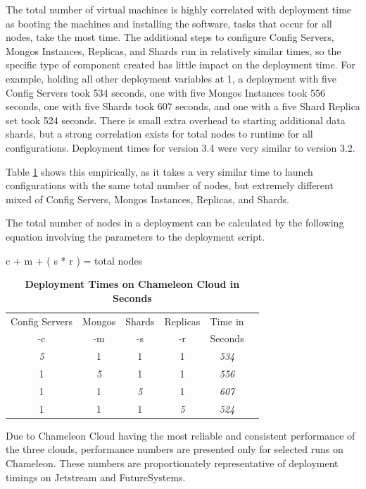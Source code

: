 \documentclass[9pt,twocolumn,twoside]{../../styles/osajnl}
\begin{document}
The total number of virtual machines is highly correlated with deployment time as booting the machines and installing the software, tasks that occur for all nodes, take the most time.  The additional steps to configure Config Servers, Mongos Instances, Replicas, and Shards run in relatively similar times, so the specific type of component created has little impact on the deployment time.  For example, holding all other deployment variables at 1, a deployment with five Config Servers took 534 seconds, one with five Mongos Instances took 556 seconds, one with five Shards took 607 seconds, and one with a five Shard Replica set took 524 seconds.  There is small extra overhead to starting additional data shards, but a strong correlation exists for total nodes to runtime for all configurations.  Deployment times for version 3.4 were very similar to version 3.2.

Table \ref{tab:deploy-times2} shows this empirically, as it takes a very similar time to launch configurations with the same total number of nodes, but extremely different mixed of Config Servers, Mongos Instances, Replicas, and Shards.

The total number of nodes in a deployment can be calculated by the following equation involving the parameters to the deployment script.

c + m + ( s * r ) = total nodes

\begin{table}[htbp]
\centering
\caption{\bf Deployment Times on Chameleon Cloud in Seconds}

 \begin{tabular}{| c | c | c | c | c | c |} 
 \hline
Config Servers &  Mongos & Shards & Replicas & Time in \\
-c &  -m & -s & -r & Seconds
\\ [0.5ex] 
 \hline
 \hline
\emph{5} & 1 & 1 & 1 & \emph{534} \\
 \hline
 1 & \emph{5}  & 1 & 1 & \emph{556} \\
 \hline
 1 & 1 & \emph{5} & 1 & \emph{607} \\
 \hline
 1 & 1 & 1 & \emph{5}  & \emph{524}  \\ [1ex] 
 \hline
\end{tabular}
  \label{tab:deploy-times2}
\end{table}

Due to Chameleon Cloud having the most reliable and consistent performance of the three clouds, performance numbers are presented only for selected runs on Chameleon.  These numbers are proportionately representative of deployment timings on Jetstream and FutureSystems.
\end{document}
